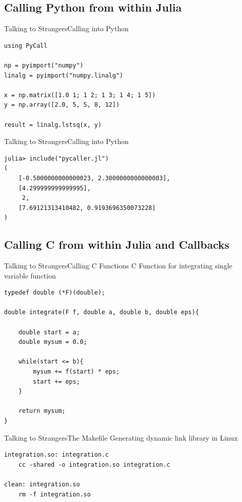 \documentclass[11pt]{beamer}
\begin{document}
\subsection{Calling Python from within Julia}
\begin{frame}[fragile]{Talking to Strangers}{Calling into Python}
\begin{lstlisting}
using PyCall

np = pyimport("numpy")
linalg = pyimport("numpy.linalg")

x = np.matrix([1.0 1; 1 2; 1 3; 1 4; 1 5])
y = np.array([2.0, 5, 5, 8, 12])

result = linalg.lstsq(x, y)
\end{lstlisting}
\end{frame}

\begin{frame}[fragile]{Talking to Strangers}{Calling into Python}
\begin{lstlisting}
julia> include("pycaller.jl")
(
	[-0.5000000000000023, 2.3000000000000003], 
	[4.299999999999995], 
	 2, 
	[7.69121313410482, 0.9193696350073228]
)
\end{lstlisting}
\end{frame}

\subsection{Calling C from within Julia and Callbacks}
\begin{frame}[fragile]{Talking to Strangers}{Calling C Functions}
C Function for integrating single variable function
\begin{lstlisting}[basicstyle=\tiny]
typedef double (*F)(double);

double integrate(F f, double a, double b, double eps){
    
    double start = a;
    double mysum = 0.0;

    while(start <= b){
        mysum += f(start) * eps;
        start += eps;
    }
    
    return mysum;
}
\end{lstlisting}
\end{frame}

\begin{frame}[fragile]{Talking to Strangers}{The Makefile}
Generating dynamic link library in Linux
\begin{lstlisting}
integration.so: integration.c
	cc -shared -o integration.so integration.c 

clean: integration.so 
	rm -f integration.so
\end{lstlisting}
\end{frame}
\end{document}
